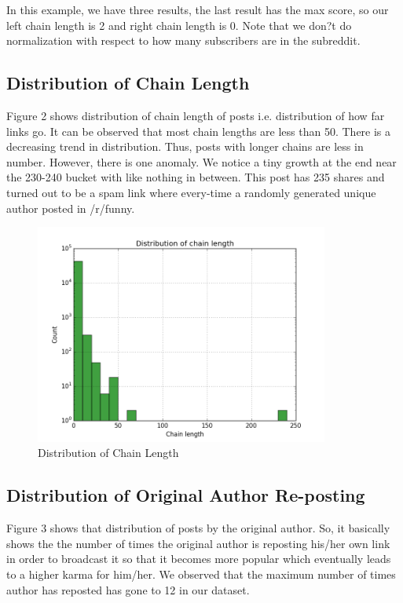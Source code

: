 \documentclass{article} %
\begin{document}
In this example, we have three results, the last result has the max score, so our left chain length is 2 and right chain length is 0.  Note that we don?t do normalization with respect to how many subscribers are in the subreddit.

\newpage

\subsection{Distribution of Chain Length}

Figure 2 shows distribution of chain length of posts i.e. distribution of how far links go. It can be observed that most chain lengths are less than 50. There is a decreasing trend in distribution. Thus, posts with longer chains are less in number. However, there is one anomaly. We notice a tiny growth at the end near the 230-240 bucket with like nothing in between. This post has 235 shares and turned out to be a spam link where every-time a randomly generated unique author posted in /r/funny.

\begin{figure}[h]
\begin{center}
\includegraphics[width=3.8in]{lengths.png}
\caption{Distribution of Chain Length}
\end{center}
\end{figure}


\subsection{Distribution of Original Author Re-posting}

Figure 3 shows that distribution of posts by the original author. So, it basically shows the the number of times the original author is reposting his/her own link in order to broadcast it so that it becomes more popular which eventually leads to a higher karma for him/her. We observed that the maximum number of times author has reposted has gone to 12 in our dataset.
\end{document}
